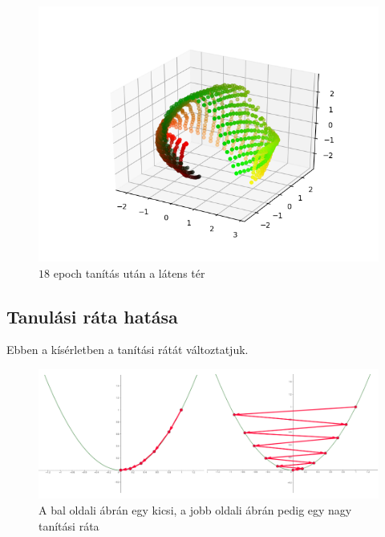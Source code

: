 \begin{figure}[h!]
\begin{center}
 
	\begin{center}
	\includegraphics[width=1\linewidth]{metrics/3D-epoch18.png}
	\end{center}
	
  \caption{$18$ epoch tanítás után a látens tér}\label{3D-epoch}
\end{center}
\end{figure}

\subsection{Tanulási ráta hatása}

Ebben a kísérletben a tanítási rátát változtatjuk.

\begin{figure}[h!]
  
  
	\begin{center}
	\includegraphics[width=1\linewidth]{parabolas.png}
	\end{center}
	
  \caption{A bal oldali ábrán egy kicsi, a jobb oldali ábrán pedig egy nagy tanítási ráta}\label{para}
\end{figure}



